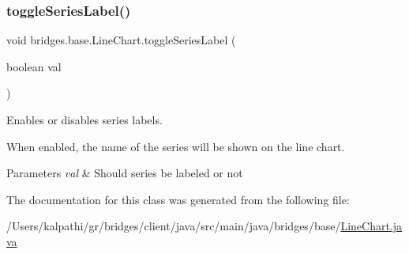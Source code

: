 \subsubsection{\texorpdfstring{toggle\+Series\+Label()}{toggleSeriesLabel()}}
{\footnotesize\ttfamily void bridges.\+base.\+Line\+Chart.\+toggle\+Series\+Label (\begin{DoxyParamCaption}\item[{boolean}]{val }\end{DoxyParamCaption})}



Enables or disables series labels. 

When enabled, the name of the series will be shown on the line chart.


\begin{DoxyParams}{Parameters}
{\em val} & Should series be labeled or not \\
\hline
\end{DoxyParams}


The documentation for this class was generated from the following file\+:\begin{DoxyCompactItemize}
\item 
/\+Users/kalpathi/gr/bridges/client/java/src/main/java/bridges/base/\mbox{\hyperlink{_line_chart_8java}{Line\+Chart.\+java}}\end{DoxyCompactItemize}
